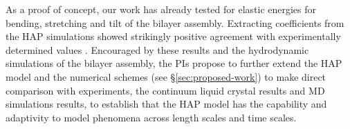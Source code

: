 As a proof of concept, our work has already tested for elastic energies for bending, stretching and tilt of the bilayer assembly.
Extracting coefficients from the HAP simulations showed strikingly positive agreement with experimentally determined values  \cite{Fu19}.
Encouraged by these results and the hydrodynamic simulations of the bilayer assembly, the PIs propose to
further extend the HAP model and the numerical schemes (see \S\ref{sec:proposed-work})
to make direct comparison with experiments, the continuum liquid crystal results and MD simulations results, to establish that
the HAP model has the capability and adaptivity to model phenomena across length scales and time scales.
%
%
%
%
%
%


%


